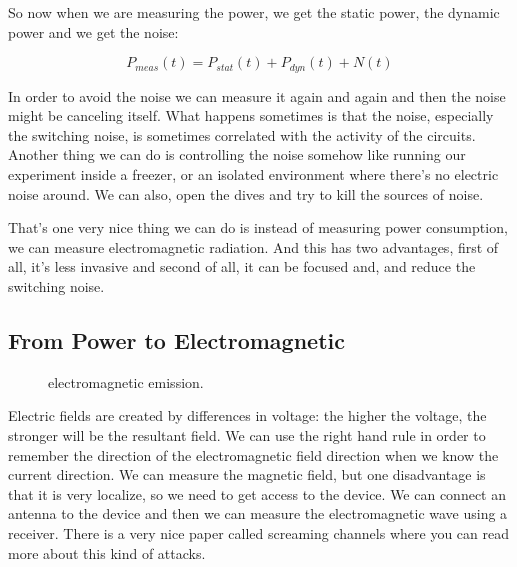 So now when we are measuring the power, we get the static power, the dynamic power and we get the noise:

\begin{displaymath}
    P_{meas}(t)=P_{stat}(t) + P_{dyn}(t) + N(t)
\end{displaymath}

In order to avoid the noise we can measure it again and again and then the noise might be canceling itself. What happens sometimes is that the noise, especially the switching noise, is sometimes correlated with the activity of the circuits. Another thing we can do is controlling the noise somehow like running our experiment inside a freezer, or an isolated environment where there's no electric noise around. We can also, open the dives and try to kill the sources of noise.

That's one very nice thing we can do is instead of measuring power consumption, we can measure electromagnetic radiation. And this has two advantages, first of all, it's less invasive and second of all, it can be focused and, and reduce the switching noise.

\subsection { From Power to Electromagnetic }

\begin{figure}[!ht]
    \centering
    
    \caption{electromagnetic emission.} \label{fig:electromagnetic emission}
\end{figure}

Electric fields are created by differences in voltage: the higher the voltage, the stronger will be the resultant field. We can use the right hand rule in order to remember the direction of the electromagnetic field direction when we know the current direction. We can measure the magnetic field, but one disadvantage is that it is very localize, so we need to get access to the device. We can connect an antenna to the device and then we can measure the electromagnetic wave using a receiver. There is a very nice paper called screaming channels where you can read more about this kind of attacks.